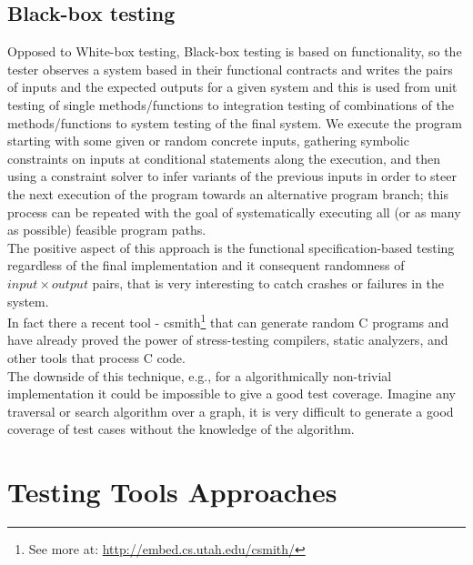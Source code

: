 \documentclass[10pt, conference, compsocconf]{IEEEtran}
\begin{document}
\subsection{Black-box testing}
Opposed to White-box testing, Black-box testing is based on functionality, so the tester observes a system based in their functional contracts and writes the
pairs of inputs and the expected outputs for a given system and this is used from unit testing of single methods/functions to integration testing
of combinations of the methods/functions to system testing of the final system.
We execute the program starting with some given or random concrete inputs, gathering symbolic constraints on inputs at conditional statements along the execution,
and then using a constraint solver to infer variants of the previous inputs in order to steer the next execution of the program
towards an alternative program branch; this process can be repeated with the goal of systematically executing all (or as many as possible) feasible program paths.\\
The positive aspect of this approach is the functional specification-based testing
regardless of the final implementation and it consequent randomness of $input \times output$ pairs, that is very interesting to catch crashes or failures in the system.\\
In fact there a recent tool - csmith\footnote{See more at: \url{http://embed.cs.utah.edu/csmith/}} that can generate random C programs and have already proved
the power of stress-testing compilers, static analyzers, and other tools that process C code\cite{Yang:2011:FUB:1993316.1993532}.\\
The downside of this technique, e.g., for a algorithmically non-trivial implementation it could be impossible to give a good test coverage.
Imagine any traversal or search algorithm over a graph, it is very difficult to generate a good coverage of test cases without the knowledge of the algorithm.

\section{Testing Tools Approaches}
\end{document}

